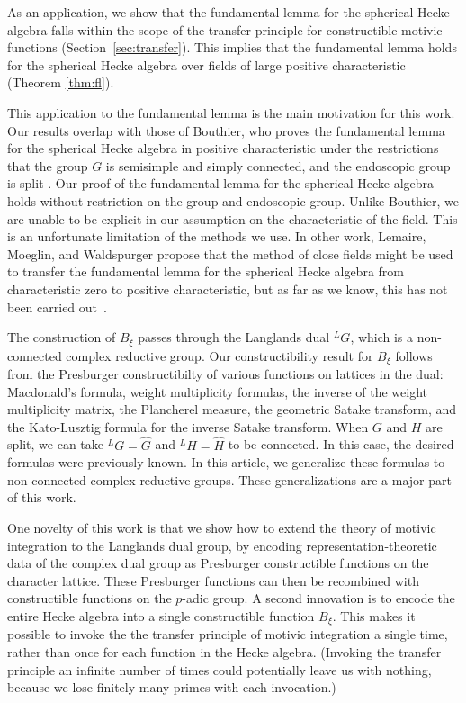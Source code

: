 As an application, we show that the fundamental lemma for the
spherical Hecke algebra falls within the scope of the transfer
principle for constructible motivic functions (Section~\ref{sec:transfer}).  This implies that the
fundamental lemma holds for the spherical Hecke algebra over fields of
large positive characteristic (Theorem \ref{thm:fl}).

This application to the fundamental lemma is the main motivation for
this work.  Our results overlap with those of Bouthier, who proves the
fundamental lemma for the spherical Hecke algebra in positive
characteristic under the restrictions that the group $G$ is semisimple
and simply connected, and the endoscopic group is split
\cite[Theorem~0.2]{bouthier}.  Our proof of the fundamental lemma for
the spherical Hecke algebra holds without restriction on the
group and endoscopic group.  Unlike Bouthier, we are unable to be
explicit in our assumption on the characteristic of the field.  This
is an unfortunate limitation of the methods we use.  In other work,
Lemaire, Moeglin, and Waldspurger propose that the method of close
fields might be used to transfer the fundamental lemma for the
spherical Hecke algebra from characteristic zero to positive
characteristic, but as far as we know, this has not been carried
out~\cite[\S1.3]{LMW}.

The construction of $B_\xi$ passes through the Langlands dual ${}^LG$,
which is a non-connected complex reductive group.  Our
constructibility result for $B_\xi$ follows from the Presburger
constructibilty of various functions on lattices in the dual:
Macdonald's formula, weight multiplicity formulas, the inverse of the
weight multiplicity matrix, the Plancherel measure, the geometric
Satake transform, and the Kato-Lusztig formula for the inverse Satake
transform.  When $G$ and $H$ are split, we can take ${}^LG = \hat G$
and ${}^LH=\hat H$ to be connected.  In this case, the desired
formulas were previously known.  In this article, we generalize these
formulas to non-connected complex reductive groups.  These
generalizations are a major part of this work.

One novelty of this work is that we show how to extend the theory of
motivic integration to the Langlands dual group, by encoding
representation-theoretic data of the complex dual group as Presburger
constructible functions on the character lattice. These Presburger
functions can then be recombined with constructible functions on the
$p$-adic group.  A second innovation is to encode the entire Hecke
algebra into a single constructible function $B_\xi$.  This makes it
possible to invoke the the transfer principle of motivic integration a
single time, rather than once for each function in the Hecke algebra.
(Invoking the transfer principle an infinite number of times could
potentially leave us with nothing, because we lose finitely many
primes with each invocation.)

